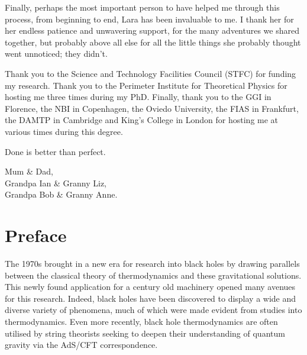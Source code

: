 \documentclass[
twoside,
openright,
frontopenright,
]{dmathesis}
\begin{document}
\begin{acknowledgements*}
  Finally, perhaps the most important person to have helped me through this
  process, from beginning to end, Lara has been invaluable to me. I thank her
  for her endless patience and unwavering support, for the many adventures we
  shared together, but probably above all else for all the little things she
  probably thought went unnoticed; they didn't.

  Thank you to the Science and Technology Facilities Council (STFC) for funding
  my research. Thank you to the Perimeter Institute for Theoretical Physics for
  hosting me three times during my PhD. Finally, thank you to the GGI in
  Florence, the NBI in Copenhagen, the Oviedo University, the FIAS in Frankfurt,
  the DAMTP in Cambridge and King's College in London for hosting me at various
  times during this degree.
 
\end{acknowledgements*}

\begin{epigraph*}
%
  Done is better than perfect.
%
\end{epigraph*}

\begin{dedication*}
%
  Mum \& Dad,\\ Grandpa Ian \& Granny Liz,\\ Grandpa Bob \& Granny Anne.
%
\end{dedication*}

\disableprotrusion
\tableofcontents*
\listoftodos
\enableprotrusion

\cleardoublepage
{}



\chapter*{Preface}

The 1970s brought in a new era for research into black holes by drawing
parallels between the classical theory of thermodynamics and these gravitational
solutions. This newly found application for a century old machinery opened many
avenues for this research. Indeed, black holes have been discovered to display a
wide and diverse variety of phenomena, much of which were made evident from
studies into thermodynamics. Even more recently, black hole thermodynamics are
often utilised by string theorists seeking to deepen their understanding of
quantum gravity via the AdS/CFT correspondence.
\end{document}
